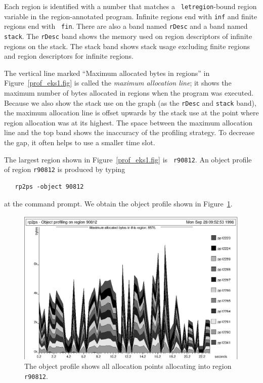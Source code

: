 \documentclass[12pt]{book}
\begin{document}
Each region is identified with a number that matches a {\tt
  letregion}-bound region variable in the region-annotated program.
Infinite regions end with {\tt inf} and finite regions end with {\tt
  fin}. There are also a band named {\tt rDesc} and a band named
{\tt stack}. The {\tt rDesc} band shows the memory used on
region descriptors of infinite regions on the stack. The stack band
shows stack usage excluding finite regions and region descriptors for
infinite regions.

The vertical line marked ``Maximum allocated bytes in regions'' in
Figure~\ref{prof_eks1.fig} is called the {\em maximum allocation
  line}; it shows the maximum number of bytes allocated in regions
when the program was executed. Because we also show the stack use on
the graph (as the {\tt rDesc} and {\tt stack} band), the maximum
allocation line is offset upwards by the stack use at the point where
region allocation was at its highest. The space between the maximum
allocation line and the top band shows the inaccuracy of the profiling
strategy. To decrease the gap, it often helps to use a smaller time
slot.

The largest region shown in Figure~\ref{prof_eks1.fig} is {\tt
  r90812}. An
%
%
object profile of region {\tt r90812} is produced by typing
\begin{verbatim}
   rp2ps -object 90812
\end{verbatim}
at the command prompt. We obtain the object profile shown in
Figure~\ref{prof_eks2.fig}.
\begin{figure}
\begin{center}
\includegraphics{prof_eks2.ps}
\end{center}
\caption{The object profile shows all allocation points allocating into region {\tt r90812}.}
\label{prof_eks2.fig}
\end{figure}
\end{document}
